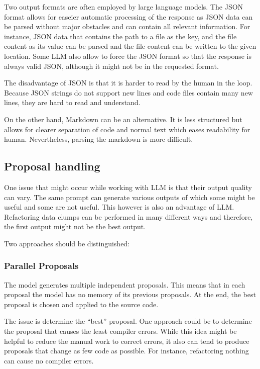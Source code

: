 Two output formats are often employed by large language models. The \ac{JSON} format allows for easeier automatic processing of the response as \ac{JSON} data can be parsed without major obstacles and can contain all relevant information. For instance, \ac{JSON} data that contains the path to a file as the key, and the file content as its value can be parsed and the file content can be written to the given location. Some \acs{LLM} also allow to force the \ac{JSON} format so that the response is always valid \ac{JSON}, although it might not be in the requested format. 

The disadvantage of \ac{JSON} is that it is harder to read by the human in the loop. Because JSON strings do not support new lines and code files contain many new lines, they are hard to read and understand.

On the other hand, Markdown can be an alternative. It is less structured but allows for clearer separation of code and normal text which eases readability for human. Nevertheless, parsing the markdown is more difficult. 



\subsection{Proposal handling}

One issue that might occur while working with \ac{LLM} is that their output quality can vary. The same prompt can generate various outputs of which some might be useful and some are not useful. This however is also an advantage of \acs{LLM}. Refactoring data clumps can be performed in many different ways and therefore, the first output might not be the best output. 

Two approaches should be distinguished:
\subsubsection{Parallel Proposals}
The model generates multiple independent proposals. This means that in each proposal the model has no memory of its previous proposals. At the end, the best proposal is chosen and applied to the source code.

The issue is determine the \enquote{best} proposal. One approach could be to determine the proposal that causes the least compiler errors. While this idea might be helpful to reduce the manual work to correct errors, it also can tend to produce proposals that change as few code as possible. For instance, refactoring nothing can cause no compiler errors.

